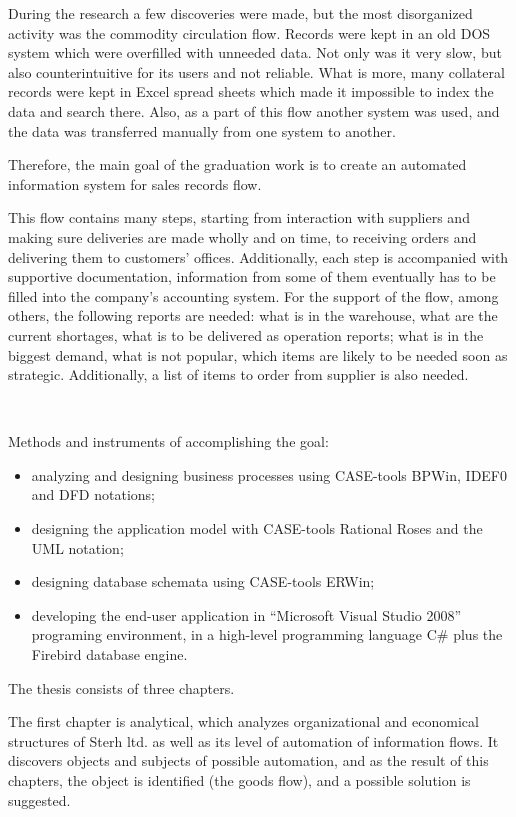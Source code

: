 \documentclass[a4paper, 12pt]{article}
\begin{document}
During the research a few discoveries were made, but the most disorganized activity was the commodity circulation flow. Records were kept in an old DOS system which were overfilled with unneeded data. Not only was it very slow, but also counterintuitive for its users and not reliable. What is more, many collateral records were kept in Excel spread sheets which made it impossible to index the data and search there. Also, as a part of this flow another system was used, and the data was transferred manually from one system to another.

Therefore, the main goal of the graduation work is to create an automated information system for sales records flow.

This flow contains many steps, starting from interaction with suppliers and making sure deliveries are made wholly and on time, to receiving orders and delivering them to customers' offices. Additionally, each step is accompanied with supportive documentation, information from some of them eventually has to be filled into the company's accounting system. For the support of the flow, among others, the following reports are needed: what is in the warehouse, what are the current shortages, what is to be delivered as operation reports; what is in the biggest demand, what is not popular, which items are likely to be needed soon as strategic. Additionally, a list of items to order from supplier is also needed.

\

Methods and instruments of accomplishing the goal:

\begin{itemize}
\itemsep0pt
\item analyzing and designing business processes using CASE-tools BPWin, IDEF0 and DFD notations;
\item designing the application model with CASE-tools Rational Roses and the UML notation;
\item designing database schemata using CASE-tools ERWin;
\item developing the end-user application in ``Microsoft Visual Studio 2008'' programing environment, in a high-level programming language C\# plus the Firebird database engine.
\end{itemize}

The thesis consists of three chapters.

The first chapter is analytical, which analyzes organizational and economical structures of Sterh ltd. as well as its level of automation of information flows. It discovers objects and subjects of possible automation, and as the result of this chapters, the object is identified (the goods flow), and a possible solution is suggested.
\end{document}
